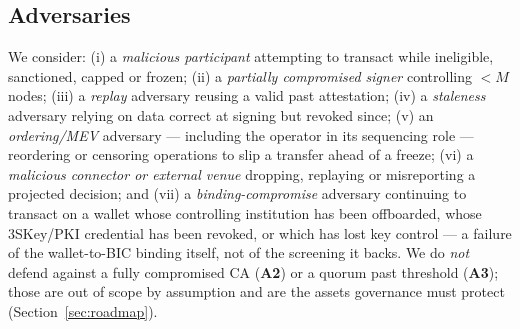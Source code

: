 \documentclass[11pt,a4paper]{article}
\newcommand{\Aref}[1]{\textbf{A#1}}
\begin{document}
\subsection{Adversaries}
We consider: (i) a \emph{malicious participant} attempting to transact while
ineligible, sanctioned, capped or frozen; (ii) a \emph{partially compromised
signer} controlling $<M$ nodes; (iii) a \emph{replay} adversary reusing a valid
past attestation; (iv) a \emph{staleness} adversary relying on data correct at
signing but revoked since; (v) an \emph{ordering/MEV} adversary --- including the
operator in its sequencing role --- reordering or censoring operations to slip a
transfer ahead of a freeze; (vi) a \emph{malicious connector or external venue}
dropping, replaying or misreporting a projected decision; and (vii) a
\emph{binding-compromise} adversary continuing to transact on a wallet whose
controlling institution has been offboarded, whose 3SKey/PKI credential has been
revoked, or which has lost key control --- a failure of the wallet-to-BIC binding
itself, not of the screening it backs. We do \emph{not} defend against a fully
compromised CA (\Aref{2}) or a quorum past threshold (\Aref{3}); those are out of
scope by assumption and are the assets governance must protect
(Section~\ref{sec:roadmap}).
\end{document}
